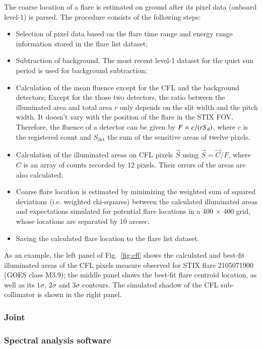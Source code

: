 \documentclass[referee]{aa} %
\begin{document}
The coarse location of a flare  is estimated on ground after its pixel data (onboard level-1) is parsed.
The procedure consists of the following steps:
\begin{itemize}
  \item Selection of pixel data based on the flare time range and energy range information stored in the flare list dataset;
  \item Subtraction of background. The most recent level-1 dataset for the quiet sun period is used for background subtraction;
  \item Calculation of the mean fluence except for the CFL and the background detectors; 
      Except for the those two detectors, the ratio between the illuminated area and total area $r$ only depends on the 
      slit width and the pitch width. It doesn't vary with the position of the flare in the STIX FOV.  
      Therefore, the fluence of a detector can be given by $F=c/(r S_{\rm d})$,  where $c$ is the registered 
      count and $S_\textrm{det}$ the sum of the sensitive areas of twelve pixels. 
  \item Calculation of the illuminated areas on CFL pixels $\vec{S}$ using $\vec{S} = \vec{C}/F$, where $C$  is an array of counts 
  recorded by 12 pixels. Their errors of the areas are also calculated; 
  \item  Coarse flare location is estimated by minimizing the weighted sum of squared deviations 
  (i.e. weighted chi-squares) between  the calculated illuminated areas and  expectations
  simulated for potential flare locations in a 400 $\times$ 400 grid, whose locations are separated by 10 arcsec.  
  \item Saving the calculated flare location to the flare list dataset. 
\end{itemize}
As an example, the left panel of Fig.~\ref{fig:cfl} shows the calculated and best-fit illuminated areas 
of the CFL pixels measure observed for STIX flare 2105071900 (GOES class M3.9);   the middle panel shows the best-fit 
flare centroid location, as well as its $1\sigma$, $2\sigma$ and $3\sigma$ contours. 
The simulated shadow of the CFL sub-collimator  is shown in the right panel. 
\subsubsection{Joint}
\subsubsection{Spectral analysis software}
\end{document}
